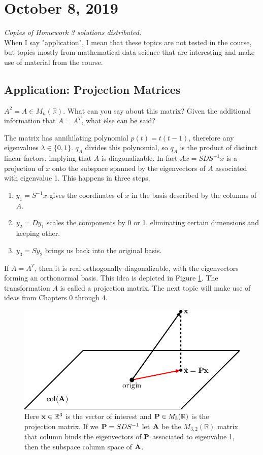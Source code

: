 \documentclass[11pt]{article}
\newcommand{\R}{\ensuremath{\mathbb R}}
\theoremstyle{plain}
\theoremstyle{definition}
\theoremstyle{remark}
\begin{document}
\section{October 8, 2019}

{\it Copies of Homework 3 solutions distributed.}\\

When I say "application", I mean that these topics are not tested in the course, but topics mostly from mathematical data science that are interesting and make use of material from the course.

\subsection*{Application: Projection Matrices} 

$A^2 = A \in M_n(\R)$. What can you say about this matrix? Given the additional information that $A = A^T$, what else can be said?

The matrix has annihilating polynomial $p(t) = t(t-1)$, therefore any eigenvalues $\lambda \in \{0,1\}$. $q_A$ divides this polynomial, so $q_A$ is the product of distinct linear factors, implying that $A$ is diagonalizable. In fact $Ax = SDS^{-1}x$ is a projection of $x$ onto the subspace spanned by the eigenvectors of $A$ associated with eigenvalue 1. This happens in three steps.
\begin{enumerate}
    \item $y_1 = S^{-1}x$ gives the coordinates of $x$ in the basis described by the columns of $A$.
    \item $y_2 = Dy_1$ scales the components by 0 or 1, eliminating certain dimensions and keeping other.
    \item $y_3 = Sy_2$ brings us back into the original basis.
\end{enumerate}
If $A = A^T$, then it is real orthogonally diagonalizable, with the eigenvectors forming an orthonormal basis. This idea is depicted in Figure \ref{fig:proj}. The transformation $A$ is called a projection matrix. The next topic will make use of ideas from Chapters 0 through 4.

\begin{figure}[h!]
    \centering
    \includegraphics[width=0.6\linewidth]{figures/projection.png}
    \caption{Here ${\bf x} \in \R^3$ is the vector of interest and ${\bf P} \in M_3(\R)$ is the projection matrix. If we ${\bf P} = SDS^{-1}$ let ${\bf A}$ be the $M_{3,2}(\R)$ matrix that column binds the eigenvectors of ${\bf P}$ associated to eigenvalue 1, then the subspace column space of ${\bf A}$.}
    \label{fig:proj}
\end{figure}
\end{document}
